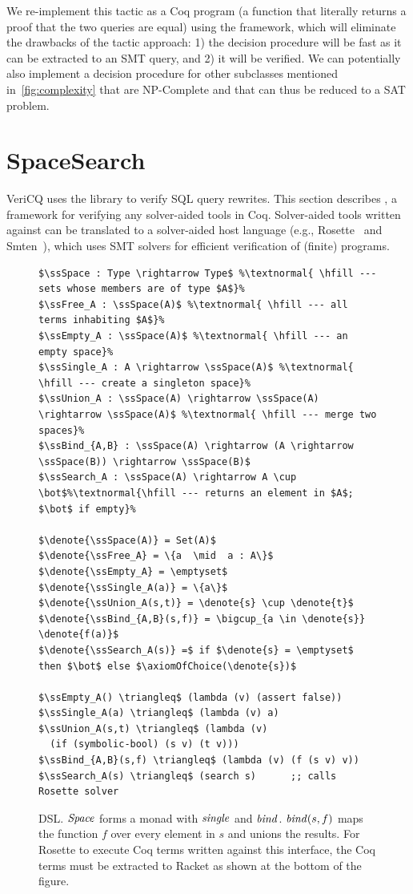 We re-implement this tactic as a Coq program (a
function that literally returns a proof that the two queries are equal)
using the \SpaceSearch
framework, which will eliminate the drawbacks of the tactic approach:
1) the decision procedure will be fast as it can be extracted to an SMT query, and
2) it will be verified.
%
We can potentially also implement a decision procedure for other
subclasses mentioned in~\ref{fig:complexity} that are NP-Complete and
that can thus be reduced to a SAT problem.


\section{SpaceSearch}

VeriCQ uses the \SpaceSearch library to verify SQL query rewrites. 
This section describes \SpaceSearch, a framework for verifying any solver-aided 
tools in Coq. Solver-aided tools written against \SpaceSearch can be
translated to a solver-aided host language (e.g., Rosette~\cite{rosette:onward13} and Smten~\cite{smten}), which 
uses SMT solvers for efficient verification of (finite) programs.

\begin{figure}
\begin{lstlisting}
$\ssSpace : Type \rightarrow Type$ %\textnormal{ \hfill --- sets whose members are of type $A$}%
$\ssFree_A : \ssSpace(A)$ %\textnormal{ \hfill --- all terms inhabiting $A$}%
$\ssEmpty_A : \ssSpace(A)$ %\textnormal{ \hfill --- an empty space}%
$\ssSingle_A : A \rightarrow \ssSpace(A)$ %\textnormal{ \hfill --- create a singleton space}%
$\ssUnion_A : \ssSpace(A) \rightarrow \ssSpace(A) \rightarrow \ssSpace(A)$ %\textnormal{ \hfill --- merge two spaces}%
$\ssBind_{A,B} : \ssSpace(A) \rightarrow (A \rightarrow \ssSpace(B)) \rightarrow \ssSpace(B)$
$\ssSearch_A : \ssSpace(A) \rightarrow A \cup \bot$%\textnormal{\hfill --- returns an element in $A$; $\bot$ if empty}%

$\denote{\ssSpace(A)} = Set(A)$
$\denote{\ssFree_A} = \{a  \mid  a : A\}$
$\denote{\ssEmpty_A} = \emptyset$
$\denote{\ssSingle_A(a)} = \{a\}$
$\denote{\ssUnion_A(s,t)} = \denote{s} \cup \denote{t}$
$\denote{\ssBind_{A,B}(s,f)} = \bigcup_{a \in \denote{s}} \denote{f(a)}$
$\denote{\ssSearch_A(s)} =$ if $\denote{s} = \emptyset$ then $\bot$ else $\axiomOfChoice(\denote{s})$

$\ssEmpty_A() \triangleq$ (lambda (v) (assert false))
$\ssSingle_A(a) \triangleq$ (lambda (v) a)
$\ssUnion_A(s,t) \triangleq$ (lambda (v) 
  (if (symbolic-bool) (s v) (t v)))
$\ssBind_{A,B}(s,f) \triangleq$ (lambda (v) (f (s v) v))
$\ssSearch_A(s) \triangleq$ (search s)      ;; calls Rosette solver

\end{lstlisting}
\caption{\SpaceSearch DSL\@. 
$\mathit{Space}$ forms a monad with $\mathit{single}$ and $\mathit{bind}$.
$\mathit{bind}(s,f)$ maps the function $f$ over every element in $s$ and unions the results.
For Rosette to execute Coq terms written against this interface, the Coq terms
must be extracted to Racket as shown at the bottom of the figure.}
\label{fig:rosette}
\end{figure}


